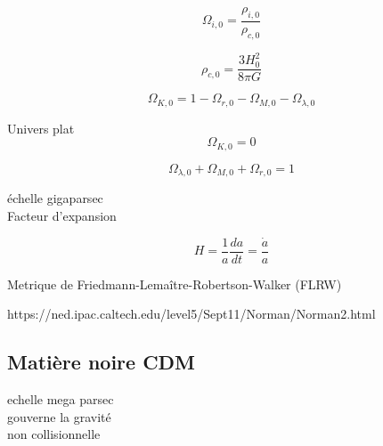 \begin{equation}
 \Omega_{i,0} = \frac{\rho_{i,0}}{\rho_{c,0}}
 \end{equation}

\begin{equation}
\rho_{c,0} = \frac{3H_0^2}{8\pi G}
 \end{equation}
 
 
\begin{equation}
 \Omega_{K,0} = 1 - \Omega_{r,0} - \Omega_{M,0} - \Omega_{\lambda,0} 
 \end{equation}

Univers plat
\begin{equation}
 \Omega_{K,0} = 0
 \end{equation}

\begin{equation}
\Omega_{\lambda,0} +  \Omega_{M,0} + \Omega_{r,0} =1
 \end{equation}




échelle gigaparsec\\
Facteur d'expansion


\begin{equation}
H=\frac{1}{a} \frac{da}{dt} = \frac{\dot{a}}{a}
\end{equation}

Metrique de Friedmann-Lemaître-Robertson-Walker (FLRW)


https://ned.ipac.caltech.edu/level5/Sept11/Norman/Norman2.html

\subsection{Matière noire CDM}

echelle mega parsec\\
gouverne la gravité\\
non collisionnelle\\


